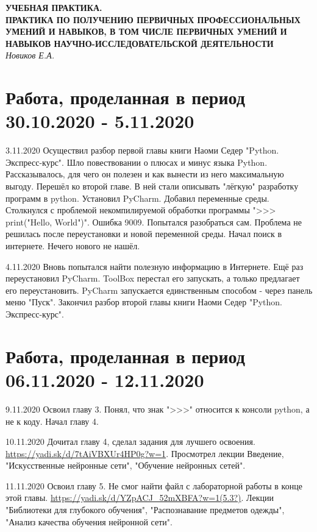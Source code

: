 \documentclass[12pt,a4paper]{report}
\begin{document}
	\begin{center}
		{\large\bf УЧЕБНАЯ ПРАКТИКА.\\
			ПРАКТИКА ПО ПОЛУЧЕНИЮ ПЕРВИЧНЫХ  ПРОФЕССИОНАЛЬНЫХ УМЕНИЙ И НАВЫКОВ, В ТОМ ЧИСЛЕ ПЕРВИЧНЫХ УМЕНИЙ И НАВЫКОВ НАУЧНО-ИССЛЕДОВАТЕЛЬСКОЙ ДЕЯТЕЛЬНОСТИ}\\
		{\it Новиков Е.А.}
	\end{center}
	
	\newpage
	
	\section{Работа, проделанная в период 30.10.2020 - 5.11.2020}
	3.11.2020 Осуществил разбор первой главы книги Наоми Седер "Python. Экспресс-курс". Шло повествовании о плюсах и минус языка Python. Рассказывалось, для чего он полезен и как вынести из него максимальную выгоду. Перешёл ко второй главе. В ней стали описывать "лёгкую" разработку программ в python. Установил PyCharm. Добавил переменные среды. Столкнулся с проблемой некомпилируемой обработки программы ">>> print("Hello, World")". Ошибка 9009. Попытался разобраться сам. Проблема не решилась после переустановки и новой переменной среды. Начал поиск в интернете. Нечего нового не нашёл.

	4.11.2020 Вновь попытался найти полезную информацию в Интернете. Ещё раз переустановил PyCharm. ToolBox перестал его запускать, а только предлагает его переустановить. PyCharm запускается единственным способом - через панель меню "Пуск". Закончил разбор второй главы книги Наоми Седер "Python. Экспресс-курс".
	
	\section{Работа, проделанная в период 06.11.2020 - 12.11.2020}
	9.11.2020 Освоил главу 3. Понял, что знак ">>>" относится к консоли python, а не к коду. Начал главу 4.

	10.11.2020 Дочитал главу 4, сделал задания для лучшего освоения. \url{https://yadi.sk/d/7tAiVBXUr4HP0g?w=1}. Просмотрел лекции Введение, "Искусственные нейронные сети", "Обучение нейронных сетей".

	11.11.2020 Освоил главу 5. Не смог найти файл с лабораторной работы в конце этой главы. \url{https://yadi.sk/d/YZpACJ_52mXBFA?w=1(5.3?)}. Лекции "Библиотеки для глубокого обучения", "Распознавание предметов одежды", "Анализ качества обучения нейронной сети".
	
\end{document}

